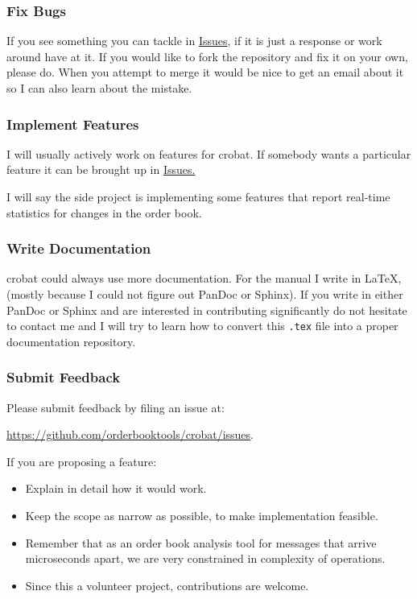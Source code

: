 \documentclass[refman]{article}
\begin{document}
 \subsubsection{Fix Bugs}
 
 If you see something you can tackle in \href{https://github.com/orderbooktools/crobat/issues}{Issues}, if it is just a response or work around have at it. If you would like to fork the repository and fix it on your own, please do. When you attempt to merge it would be nice to get an email about it so I can also learn about the mistake. 
 
 \subsubsection{Implement Features}
 
 I will usually actively work on features for crobat. If somebody wants a particular feature it can be brought up in \href{https://github.com/orderbooktools/crobat/issues}{Issues.}
 \smallskip
 
 \noindent I will say the side project is implementing some features that report real-time statistics for changes in the order book.
 
 \subsubsection{Write Documentation}
 
 crobat could always use more documentation. For the manual I write in \LaTeX, (mostly because  I could not figure out PanDoc or Sphinx). If you write in either PanDoc or Sphinx and are interested in contributing significantly do not hesitate to contact me and I will try to learn how to convert this \texttt{.tex} file into a proper documentation repository.
 
 \subsubsection{Submit Feedback}
 
 Please submit feedback by filing an issue at:
 
 \noindent  \href{https://github.com/orderbooktools/crobat/issues}{https://github.com/orderbooktools/crobat/issues}.
 \smallskip
 
 \noindent If you are proposing a feature:\begin{itemize}
 	\item Explain in detail how it would work.
 	\item Keep the scope as narrow as possible, to make implementation feasible.
 	\item Remember that as an order book analysis tool for messages that arrive microseconds apart, we are very constrained in complexity of operations.
 	\item Since this a volunteer project, contributions are welcome.
 \end{itemize}
  
\end{document}
